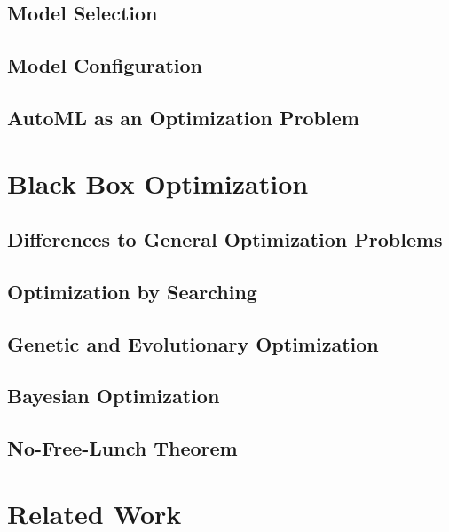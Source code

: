 \Blindtext

\subsection{Model Selection}
\label{sec:theory:automl:selection}

\Blindtext

\subsection{Model Configuration}
\label{sec:theory:automl:configuration}

\Blindtext

\subsection{AutoML as an Optimization Problem}
\label{sec:theory:automl:optimization}

\Blindtext


\section{Black Box Optimization}
\label{sec:theory:optimization}

\Blindtext

\subsection{Differences to General Optimization Problems}
\label{sec:theory:optimization:differences}

\Blindtext

\subsection{Optimization by Searching}
\label{sec:theory:optimization:search}

\Blindtext

\subsection{Genetic and Evolutionary Optimization}
\label{sec:theory:optimization:genetic}

\Blindtext

\subsection{Bayesian Optimization}
\label{sec:theory:optimization:bayesian}

\Blindtext

\subsection{No-Free-Lunch Theorem}
\label{sec:theory:optimization:lunch}

\Blindtext

\section{Related Work}
\label{sec:theory:related}

\Blindtext
